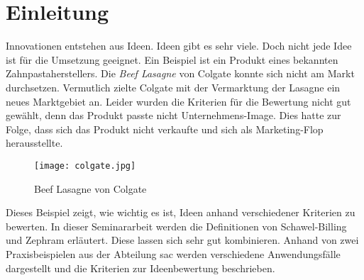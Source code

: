 \section{Einleitung}\label{sec:einleitung}
Innovationen entstehen aus Ideen. Ideen gibt es sehr viele. Doch nicht jede Idee ist für die 
Umsetzung geeignet. Ein Beispiel ist ein Produkt eines bekannten Zahnpastaherstellers. 
Die \textit{Beef Lasagne} von Colgate konnte sich nicht am Markt durchsetzen. 
Vermutlich zielte Colgate mit der Vermarktung der Lasagne ein neues Marktgebiet an. 
Leider wurden die Kriterien für die Bewertung nicht gut gewählt, denn das Produkt passte nicht Unternehmens-Image.
Dies hatte zur Folge, dass sich das Produkt nicht verkaufte und sich als Marketing-Flop herausstellte.
\begin{figure}[ht]
	\centering
	\texttt{[image: colgate.jpg]}
	\caption{Beef Lasagne von Colgate}
	\label{img:colgate}
\end{figure}
Dieses Beispiel zeigt, wie wichtig es ist, Ideen anhand verschiedener Kriterien zu bewerten. 
In dieser Seminararbeit werden die Definitionen von Schawel-Billing und Zephram erläutert. Diese lassen sich sehr gut kombinieren. 
Anhand von zwei Praxisbeispielen aus der Abteilung \ac{sac} werden verschiedene Anwendungsfälle dargestellt und die  
Kriterien zur Ideenbewertung beschrieben. 
